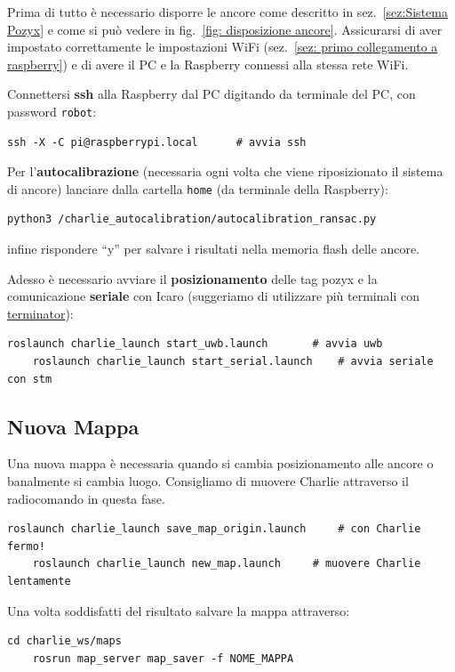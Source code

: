 Prima di tutto \`e necessario disporre le ancore come descritto in sez.~\ref{sez:Sistema Pozyx} e come si pu\`o vedere in fig.~\ref{fig: disposizione ancore}. Assicurarsi di aver impostato correttamente le impostazioni WiFi (sez.~\ref{sez: primo collegamento a raspberry}) e di avere il PC e la Raspberry connessi alla stessa rete WiFi.


Connettersi \textbf{ssh} alla Raspberry dal PC digitando da terminale del PC, con password \texttt{robot}:
\begin{lstlisting}[style=bashPC]
	ssh -X -C pi@raspberrypi.local		# avvia ssh
\end{lstlisting}

Per l'\textbf{autocalibrazione} (necessaria ogni volta che viene riposizionato il sistema di ancore) lanciare 
dalla cartella \texttt{home} (da terminale della Raspberry):
\begin{lstlisting}[style=bash]
	python3 /charlie_autocalibration/autocalibration_ransac.py
\end{lstlisting}
infine rispondere ``y'' per salvare i risultati nella memoria flash delle ancore.

Adesso \`e necessario avviare il \textbf{posizionamento} delle tag pozyx e la comunicazione \textbf{seriale} con Icaro (suggeriamo di utilizzare pi\`u terminali con \href{https://terminator-gtk3.readthedocs.io/en/latest/}{terminator}):
\begin{lstlisting}[style=bash]
	roslaunch charlie_launch start_uwb.launch		# avvia uwb
	roslaunch charlie_launch start_serial.launch	# avvia seriale con stm
\end{lstlisting}

\subsection*{Nuova Mappa}
Una nuova mappa \`e necessaria quando si cambia posizionamento alle ancore o banalmente si cambia luogo. Consigliamo di muovere Charlie attraverso il radiocomando in questa fase.
\begin{lstlisting}[style=bash]
	roslaunch charlie_launch save_map_origin.launch		# con Charlie fermo!
	roslaunch charlie_launch new_map.launch 	# muovere Charlie lentamente
\end{lstlisting}

Una volta soddisfatti del risultato salvare la mappa attraverso:
\begin{lstlisting}[style=bash]
	cd charlie_ws/maps
	rosrun map_server map_saver -f NOME_MAPPA
\end{lstlisting}

